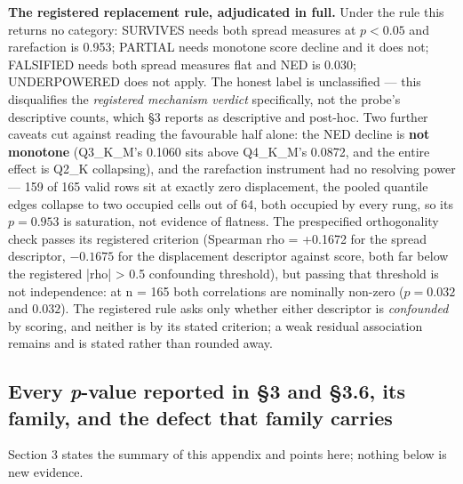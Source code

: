 \textbf{The registered replacement rule, adjudicated in full.} Under the rule this returns no category: SURVIVES needs both spread measures at $p < 0.05$ and rarefaction is 0.953; PARTIAL needs monotone score decline and it does not; FALSIFIED needs both spread measures flat and NED is 0.030; UNDERPOWERED does not apply. The honest label is unclassified --- this disqualifies the \emph{registered mechanism verdict} specifically, not the probe's descriptive counts, which \S3 reports as descriptive and post-hoc. Two further caveats cut against reading the favourable half alone: the NED decline is \textbf{not monotone} (Q3\_K\_M's 0.1060 sits above Q4\_K\_M's 0.0872, and the entire effect is Q2\_K collapsing), and the rarefaction instrument had no resolving power --- 159 of 165 valid rows sit at exactly zero displacement, the pooled quantile edges collapse to two occupied cells out of 64, both occupied by every rung, so its $p = 0.953$ is saturation, not evidence of flatness. The prespecified orthogonality check passes its registered criterion (Spearman rho = +0.1672 for the spread descriptor, $-0.1675$ for the displacement descriptor against score, both far below the registered |rho| > 0.5 confounding threshold), but passing that threshold is not independence: at n = 165 both correlations are nominally non-zero ($p = 0.032$ and $0.032$). The registered rule asks only whether either descriptor is \emph{confounded} by scoring, and neither is by its stated criterion; a weak residual association remains and is stated rather than rounded away.

\subsection{Every \emph{p}-value reported in \S3 and \S3.6, its family, and the defect that family carries}

Section 3 states the summary of this appendix and points here; nothing below is new evidence.

